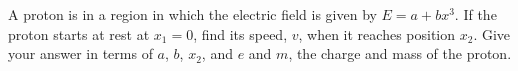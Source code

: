 A proton is in a region in which the electric field is
        given by $E=a+bx^3$. If the proton starts at rest at
        $x_1=0$, find its speed, $v$, when it reaches position
        $x_2$. Give your answer in terms of $a$, $b$, $x_2$, and $e$
        and $m$, the charge and mass of the proton.\answercheck
